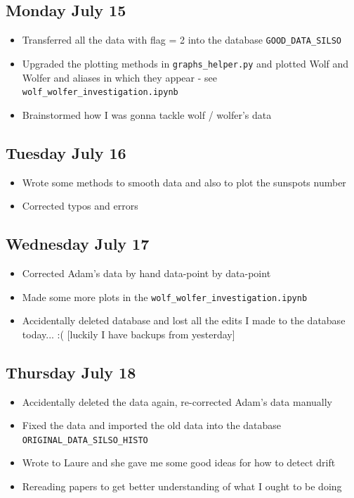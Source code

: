 \documentclass[12pt]{article}
\begin{document}
\subsection{Monday July 15}
\begin{itemize}
    \item Transferred all the data with flag = 2 into the database \texttt{GOOD\_DATA\_SILSO}
    \item Upgraded the plotting methods in \texttt{graphs\_helper.py} and plotted Wolf and Wolfer and aliases in which they appear - see \texttt{wolf\_wolfer\_investigation.ipynb}
    \item Brainstormed how I was gonna tackle wolf / wolfer's data
\end{itemize}

\subsection{Tuesday July 16}
\begin{itemize}
    \item Wrote some methods to smooth data and also to plot the sunspots number
    \item Corrected typos and errors
\end{itemize}

\subsection{Wednesday July 17}
\begin{itemize}
    \item Corrected Adam's data by hand data-point by data-point
    \item Made some more plots in the \texttt{wolf\_wolfer\_investigation.ipynb}
    \item Accidentally deleted database and lost all the edits I made to the database today... :(  [luckily I have backups from yesterday]
\end{itemize}

\subsection{Thursday July 18}
\begin{itemize}
    \item Accidentally deleted the data again, re-corrected Adam's data manually
    \item Fixed the data and imported the old data into the database \texttt{ORIGINAL\_DATA\_SILSO\_HISTO}
    \item Wrote to Laure and she gave me some good ideas for how to detect drift
    \item Rereading papers to get better understanding of what I ought to be doing
\end{itemize}
\end{document}
